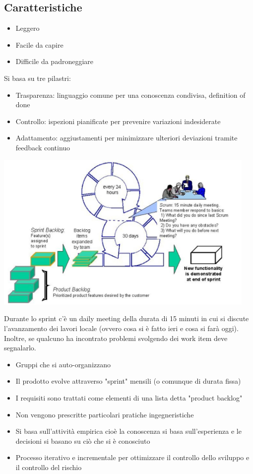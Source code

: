 \documentclass[10pt, a4paper]{article}
\begin{document}
\subsection{Caratteristiche}
\begin{itemize}
\item Leggero
\item Facile da capire
\item Difficile da padroneggiare
\end{itemize}
Si basa su tre pilastri:
\begin{itemize}
\item Trasparenza: linguaggio comune per una conoscenza condivisa, definition of done
\item Controllo: ispezioni pianificate per prevenire variazioni indesiderate
\item Adattamento: aggiustamenti per minimizzare ulteriori deviazioni tramite feedback continuo
\end{itemize}
\begin{minipage}{0.7\textwidth}
	\begin{center}
		\includegraphics[width=0.95\textwidth]{img/scrum.jpg}
	\end{center}
\end{minipage}
\begin{minipage}{0.3\textwidth}
	Durante lo sprint c'è un daily meeting della durata di 15 minuti in cui si discute l'avanzamento dei lavori locale (ovvero cosa si è fatto ieri e cosa si farà oggi). Inoltre, se qualcuno ha incontrato problemi svolgendo dei work item deve segnalarlo.
\end{minipage}

\begin{itemize}
\item Gruppi che si auto-organizzano
\item Il prodotto evolve attraverso "sprint" mensili (o comunque di durata fissa)
\item I requisiti sono trattati come elementi di una lista detta "product backlog"
\item Non vengono prescritte particolari pratiche ingegneristiche
\item Si basa sull'attività empirica cioè la conoscenza si basa sull'esperienza e  le decisioni si basano su ciò che si è conosciuto
\item Processo iterativo e incrementale per ottimizzare il controllo dello sviluppo e il controllo del rischio
\end{itemize}
\end{document}
